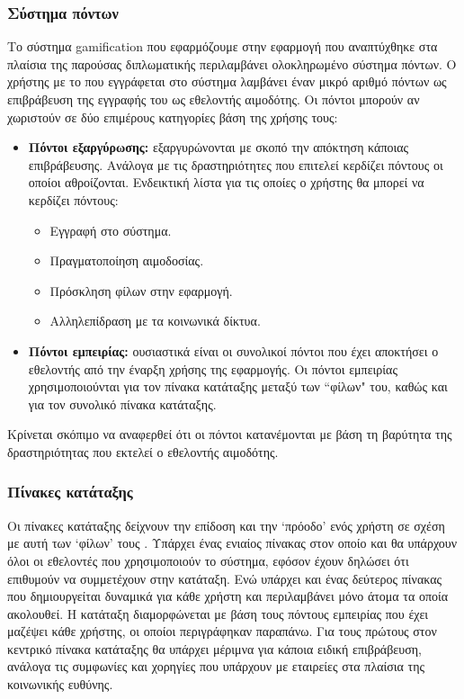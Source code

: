 	\subsubsection{Σύστημα πόντων}\label{sssect:point_system}
	
	Το σύστημα gamification που εφαρμόζουμε στην εφαρμογή που αναπτύχθηκε στα πλαίσια της παρούσας διπλωματικής περιλαμβάνει ολοκληρωμένο σύστημα πόντων. Ο χρήστης με το που εγγράφεται στο σύστημα λαμβάνει έναν μικρό αριθμό πόντων ως επιβράβευση της εγγραφής του ως εθελοντής αιμοδότης. Οι πόντοι μπορούν αν χωριστούν σε δύο επιμέρους κατηγορίες βάση της χρήσης τους:

	\begin{itemize}
		\item \textbf{Πόντοι εξαργύρωσης:} εξαργυρώνονται με σκοπό την απόκτηση κάποιας επιβράβευσης. Ανάλογα με τις δραστηριότητες που επιτελεί κερδίζει πόντους οι οποίοι αθροίζονται. Ενδεικτική λίστα για τις οποίες ο χρήστης θα μπορεί να κερδίζει πόντους:
		\begin{itemize}
			\item Εγγραφή στο σύστημα.
			\item Πραγματοποίηση αιμοδοσίας.
			\item Πρόσκληση φίλων στην εφαρμογή.
			\item Αλληλεπίδραση με τα κοινωνικά δίκτυα.
		\end{itemize}
		\item \textbf{Πόντοι εμπειρίας:} ουσιαστικά είναι οι συνολικοί πόντοι που έχει αποκτήσει ο εθελοντής από την έναρξη χρήσης της εφαρμογής. Οι πόντοι εμπειρίας χρησιμοποιούνται για τον πίνακα κατάταξης μεταξύ των ``φίλων" του, καθώς και για τον συνολικό πίνακα κατάταξης.
	\end{itemize}
	Κρίνεται σκόπιμο να αναφερθεί ότι οι πόντοι κατανέμονται με βάση τη βαρύτητα της δραστηριότητας που εκτελεί ο εθελοντής αιμοδότης.
	
	\subsubsection{Πίνακες κατάταξης}
	
	Οι πίνακες κατάταξης δείχνουν την επίδοση και την `πρόοδο' ενός χρήστη σε σχέση με αυτή των `φίλων' τους \cite{Liu:2011:GIE:2072652.2072655}. Υπάρχει ένας ενιαίος πίνακας στον οποίο και θα υπάρχουν όλοι οι εθελοντές που χρησιμοποιούν το σύστημα, εφόσον έχουν δηλώσει ότι επιθυμούν να συμμετέχουν στην κατάταξη. Ενώ υπάρχει και ένας δεύτερος πίνακας που δημιουργείται δυναμικά για κάθε χρήστη και περιλαμβάνει μόνο άτομα τα οποία ακολουθεί. Η κατάταξη διαμορφώνεται με βάση τους πόντους εμπειρίας που έχει μαζέψει κάθε χρήστης, οι οποίοι περιγράφηκαν παραπάνω. Για τους πρώτους στον κεντρικό πίνακα κατάταξης θα υπάρχει μέριμνα για κάποια ειδική επιβράβευση, ανάλογα τις συμφωνίες και χορηγίες που υπάρχουν με εταιρείες στα πλαίσια της κοινωνικής ευθύνης.
	
